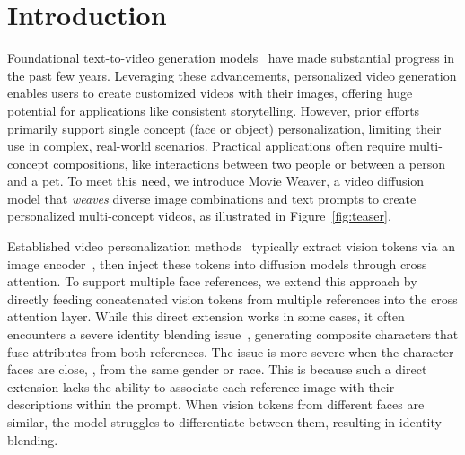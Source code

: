 
\section{Introduction}
\label{sec:intro}

Foundational text-to-video generation models~\cite{ho2022imagen,villegas2022phenaki,singer2022make,zhou2022magicvideo,chen2023videocrafter1,blattmann2023align,girdhar2023emu,guo2023animatediff,kondratyuk2023videopoet,bar2024lumiere,yang2024cogvideox,chen2024gentron,sora,luma,gen3,kling,genmo2024mochi} have made substantial progress in the past few years.
Leveraging these advancements, personalized video generation enables users to create customized videos with their images, offering huge potential for applications like consistent storytelling.
However, prior efforts~\cite{he2024id, wu2024customcrafter, moviegen} primarily support single concept (face or object) personalization, limiting their use in complex, real-world scenarios.
Practical applications often require multi-concept compositions, like interactions between two people or between a person and a pet.
To meet this need, we introduce Movie Weaver, a video diffusion model that \emph{weaves} diverse image combinations and text prompts to create personalized multi-concept videos, as illustrated in Figure~\ref{fig:teaser}.

Established video personalization methods~\cite{he2024id, wu2024customcrafter, jiang2024videobooth, moviegen} typically extract vision tokens via an image encoder~\cite{radford2021learning}, then inject these tokens into diffusion models through cross attention.
To support multiple face references, we extend this approach by directly feeding concatenated vision tokens from multiple references into the cross attention layer.
While this direct extension works in some cases, it often encounters a severe identity blending issue~\cite{kumari2023multi,xiao2024fastcomposer}, generating composite characters that fuse attributes from both references.
The issue is more severe when the character faces are close, \ie, from the same gender or race. 
This is because such a direct extension lacks the ability to associate each reference image with their descriptions within the prompt.
When vision tokens from different faces are similar, the model struggles to differentiate between them, resulting in identity blending.


